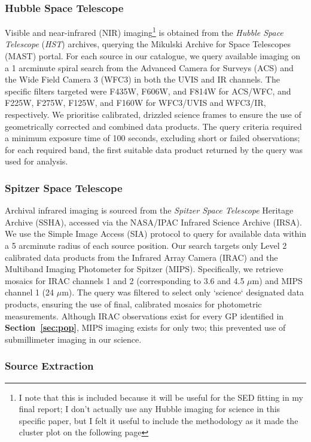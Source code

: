 \documentclass[fleqn,usenatbib]{mnras}
\begin{document}
\subsubsection{Hubble Space Telescope}
Visible and near-infrared (NIR) imaging\footnote{I note that this is included because it will be useful for the SED fitting in my final report; I don't actually use any Hubble imaging for science in this specific paper, but I felt it useful to include the methodology as it made the cluster plot on the following page} is obtained from the \textit{Hubble Space Telescope} (\textit{HST}) archives, querying the Mikulski Archive for Space Telescopes (MAST) portal. For each source in our catalogue, we query available imaging on a 1 arcminute spiral search from the Advanced Camera for Surveys (ACS) and the Wide Field Camera 3 (WFC3) in both the UVIS and IR channels. The specific filters targeted were F435W, F606W, and F814W for ACS/WFC, and F225W, F275W, F125W, and F160W for WFC3/UVIS and WFC3/IR, respectively. We prioritise calibrated, drizzled science frames to ensure the use of geometrically corrected and combined data products. The query criteria required a minimum exposure time of 100 seconds, excluding short or failed observations; for each required band, the first suitable data product returned by the query was used for analysis.

\subsubsection{Spitzer Space Telescope}
Archival infrared imaging is sourced from the \textit{Spitzer Space Telescope} Heritage Archive (SSHA), accessed via the NASA/IPAC Infrared Science Archive (IRSA). We use the Simple Image Access (SIA) protocol to query for available data within a 5 arcminute radius of each source position. Our search targets only Level 2 calibrated data products from the Infrared Array Camera (IRAC) and the Multiband Imaging Photometer for Spitzer (MIPS). Specifically, we retrieve mosaics for IRAC channels 1 and 2 (corresponding to 3.6 and 4.5 $\mu$m) and MIPS channel 1 (24 $\mu$m). The query was filtered to select only `science` designated data products, ensuring the use of final, calibrated mosaics for photometric measurements. Although IRAC observations exist for every GP identified in \textbf{Section~\ref{sec:pop}}, MIPS imaging exists for only two; this prevented use of submillimeter imaging in our science.

\subsubsection{Source Extraction}
\end{document}
